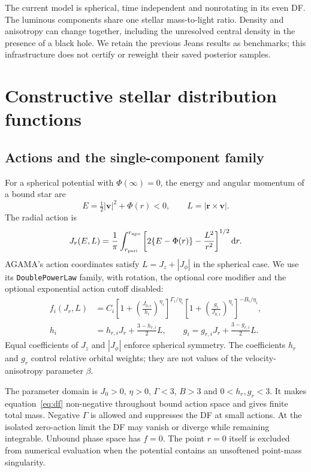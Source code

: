 \documentclass[11pt,a4paper]{article}
\newcommand{\dd}{\mathrm{d}}
\begin{document}
The current model is spherical, time independent and nonrotating in its even
DF. The luminous components share one stellar mass-to-light ratio. Density
and anisotropy can change together, including the unresolved central density
in the presence of a black hole. We retain the previous Jeans results as
benchmarks; this infrastructure does not certify or reweight their saved
posterior samples.

\section{Constructive stellar distribution functions}
\label{sec:df}

\subsection{Actions and the single-component family}

For a spherical potential with $\Phi(\infty)=0$, the energy and angular
momentum of a bound star are
\begin{equation}
 E=\tfrac12|\boldsymbol v|^2+\Phi(r)<0,\qquad
 L=|\boldsymbol r\times\boldsymbol v|.
\end{equation}
The radial action is
\begin{equation}
 J_r(E,L)=\frac{1}{\pi}\int_{r_{\rm peri}}^{r_{\rm apo}}
 \left[2\{E-\Phi(r)\}-\frac{L^2}{r^2}\right]^{1/2}\dd r.
 \label{eq:jr}
\end{equation}
AGAMA's action coordinates satisfy $L=J_z+|J_\phi|$ in the spherical case.
We use its \texttt{DoublePowerLaw} family, with rotation, the optional core
modifier and the optional exponential action cutoff disabled:
\begin{align}
 f_i(J_r,L)&=C_i
 \left[1+\left(\frac{J_{0,i}}{h_i}\right)^{\eta_i}\right]^{\Gamma_i/\eta_i}
 \left[1+\left(\frac{g_i}{J_{0,i}}\right)^{\eta_i}\right]^{-B_i/\eta_i},
 \label{eq:df}\\
 h_i&=h_{r,i}J_r+\frac{3-h_{r,i}}{2}L,\qquad
 g_i=g_{r,i}J_r+\frac{3-g_{r,i}}{2}L. \label{eq:actionweights}
\end{align}
Equal coefficients of $J_z$ and $|J_\phi|$ enforce spherical symmetry.
The coefficients $h_r$ and $g_r$ control relative orbital weights; they are
not values of the velocity-anisotropy parameter $\beta$.

The parameter domain is $J_0>0$, $\eta>0$, $\Gamma<3$, $B>3$ and
$0<h_r,g_r<3$. It makes equation~\eqref{eq:df} non-negative throughout bound
action space and gives finite total mass. Negative $\Gamma$ is allowed and
suppresses the DF at small actions. At the isolated zero-action limit the
DF may vanish or diverge while remaining integrable. Unbound phase space has
$f=0$. The point $r=0$ itself is excluded from numerical evaluation when the
potential contains an unsoftened point-mass singularity.
\end{document}
